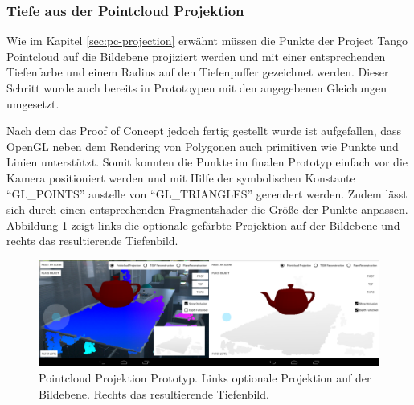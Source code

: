 \subsubsection*{Tiefe aus der Pointcloud Projektion}

Wie im Kapitel \ref{sec:pc-projection} erwähnt müssen die Punkte der Project Tango Pointcloud auf die Bildebene projiziert werden und mit einer entsprechenden Tiefenfarbe und einem Radius auf den Tiefenpuffer gezeichnet werden. Dieser Schritt wurde auch bereits in Prototoypen mit den angegebenen Gleichungen umgesetzt. 

Nach dem das Proof of Concept jedoch fertig gestellt wurde ist aufgefallen, dass OpenGL neben dem Rendering von Polygonen auch primitiven wie Punkte und Linien unterstützt. Somit konnten die Punkte im finalen Prototyp einfach vor die Kamera positioniert werden und mit Hilfe der symbolischen Konstante \enquote{GL\_POINTS} anstelle von \enquote{GL\_TRIANGLES} gerendert werden. Zudem lässt sich durch einen entsprechenden Fragmentshader die Größe der Punkte anpassen. Abbildung \ref{fig:pc-demo} zeigt links die optionale gefärbte Projektion auf der Bildebene und rechts das resultierende Tiefenbild.

\begin{figure}[h]
  \centering
	\includegraphics[width=1.0\textwidth]{content/images/implementation/pc-demo.png} 
  \caption{Pointcloud Projektion Prototyp. Links optionale Projektion auf der Bildebene. Rechts das resultierende Tiefenbild.}
  \label{fig:pc-demo}
\end{figure}




